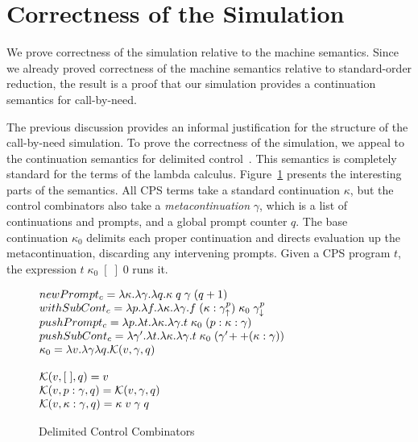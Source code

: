 \documentclass{LMCS}
\newenvironment{boxedarray}[1]
  {\begin{lrbox}{\saveboxedarray}\begin{math}\begin{array}{#1}}
  {\end{array}\end{math}\end{lrbox}\fbox{\usebox{\saveboxedarray}}}
\theoremstyle{plain}
\theoremstyle{remark}
\begin{document}
\section{Correctness of the Simulation}

We prove correctness of the simulation relative to the machine semantics.
Since we already proved correctness of the machine semantics relative to
standard-order reduction, the result is a proof that our simulation
provides a continuation semantics for call-by-need.

The previous discussion provides an informal justification for the structure of
the call-by-need simulation.  To prove the correctness of the simulation, we
appeal to the continuation semantics for delimited
control~\cite{dybvig07monadic}.  This semantics is completely standard for the
terms of the lambda calculus.  Figure~\ref{fig:dc-combinators} presents the
interesting parts of the semantics.  All CPS terms take a standard continuation
$\kappa$, but the control combinators also take a \emph{metacontinuation}
$\gamma$, which is a list of continuations and prompts, and a global prompt
counter $q$.  The base continuation $\kappa_0$ delimits each proper
continuation and directs evaluation up the metacontinuation, discarding any
intervening prompts. Given a CPS program $t$, the expression
$t\;\kappa_0\;[\;]\;0$ runs it.

\begin{figure}[t]
  \centering\small
  \begin{boxedarray}{@{}l@{}}
    newPrompt_c = \lambda\kappa.\lambda\gamma.\lambda q.\kappa\;q\;\gamma\;(q+1)
    \\
    withSubCont_c =  \lambda p.\lambda f.\lambda\kappa.\lambda\gamma.
    f\;(\kappa:\gamma^p_\uparrow)\;\kappa_0\;\gamma^p_\downarrow \\
    pushPrompt_c = \lambda p.\lambda t.\lambda\kappa.\lambda\gamma.
    t\;\kappa_0\; (p:\kappa:\gamma)  \\
    pushSubCont_c = \lambda\gamma'.\lambda t.\lambda\kappa.\lambda\gamma.
    t\;\kappa_0\; (\gamma'\! ++ (\kappa:\gamma)) \\
    \kappa_0 = \lambda v.\lambda\gamma\lambda q.\mathcal{K}(v,\gamma,q) \\
    \\
    \mathcal{K}(v,[\;],q) = v\\
    \mathcal{K}(v,p:\gamma,q) = \mathcal{K}(v,\gamma,q) \\
    \mathcal{K}(v,\kappa:\gamma,q) = \kappa\;v\;\gamma\;q \\
    \end{boxedarray}
   \caption{Delimited Control Combinators}
  \label{fig:dc-combinators}
\end{figure}
\end{document}
